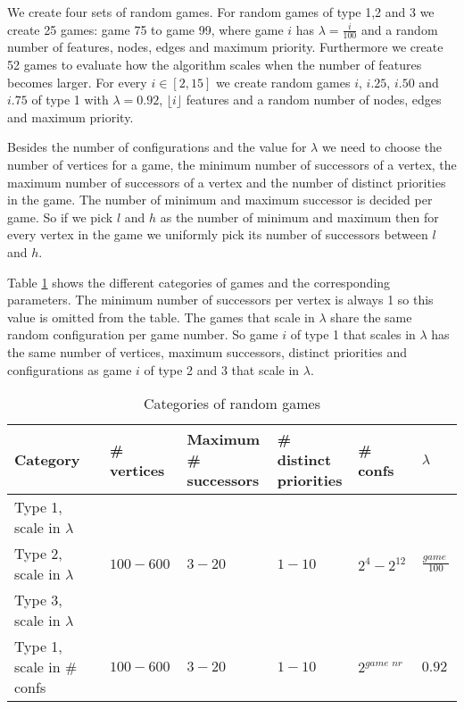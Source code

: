 We create four sets of random games. For random games of type 1,2 and 3 we create 25 games: game 75 to game 99, where game $i$ has $\lambda=\frac{i}{100}$ and a random number of features, nodes, edges and maximum priority. Furthermore we create 52 games to evaluate how the algorithm scales when the number of features becomes larger. For every $i \in [2,15]$ we create random games $i$, $i.25$, $i.50$ and $i.75$ of type 1 with $\lambda=0.92$, $\lfloor i\rfloor$ features and a random number of nodes, edges and maximum priority. 

Besides the number of configurations and the value for $\lambda$ we need to choose the number of vertices for a game, the minimum number of successors of a vertex, the maximum number of successors of a vertex and the number of distinct priorities in the game. The number of minimum and maximum successor is decided per game. So if we pick $l$ and $h$ as the number of minimum and maximum then for every vertex in the game we uniformly pick its number of successors between $l$ and $h$.

Table \ref{tab_random_games} shows the different categories of games and the corresponding parameters. The minimum number of successors per vertex is always 1 so this value is omitted from the table. The games that scale in $\lambda$ share the same random configuration per game number. So game $i$ of type 1 that scales in $\lambda$ has the same number of vertices, maximum successors, distinct priorities and configurations as game $i$ of type 2 and 3 that scale in $\lambda$.

\begin{table}
\centering
	\begin{tabular}{|l|l|l|l|l|l|}
		\hline
		Category & \# vertices & \shortstack{Maximum \\\# successors} & \shortstack{\# distinct\\priorities} & \# confs  & $\lambda$ \\ \hline
		Type 1, scale in $\lambda$ & & & & & \\ \cline{1-1}  
		Type 2, scale in $\lambda$ &$100-600$  & $3-20$                   & $1-10$                          & $2^{4}-2^{12}$ & $\frac{\textit{game nr}}{100}$            \\ \cline{1-1} 
		Type 3, scale in $\lambda$ & & & & & \\ \hline
		Type 1, scale in \# confs          & $100-600$            &  $3-20$                   & $1-10$                          & $2^\textit{game nr}$                & $0.92$                   \\ \hline
	\end{tabular}
\caption{Categories of random games}
	\label{tab_random_games}
\end{table}
